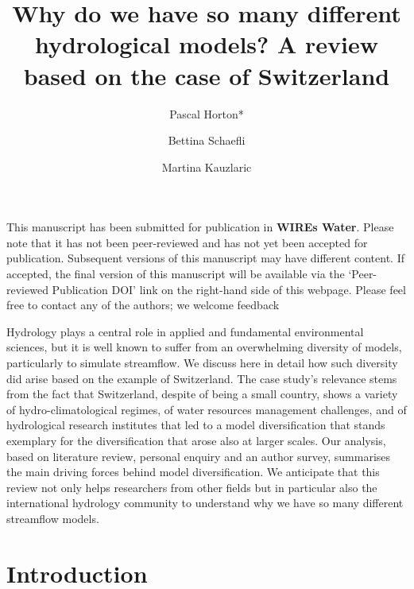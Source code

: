 \documentclass[10pt,a4paper]{article}
\def\preprint{}
\renewenvironment{abstract}
 {{\bfseries\noindent{\abstractname}\par\nobreak}\footnotesize}
 {\bigskip}
\begin{document}
\title{Why do we have so many different hydrological models? A review based on the case of Switzerland}


\author[1]{Pascal Horton*}
\author[1]{Bettina Schaefli}
\author[1]{Martina Kauzlaric}


\date{}


\ifdefined\preprint
\setcounter{page}{0}
\hrulefill

This manuscript has been submitted for publication in \textbf{WIREs Water}. Please note that it has not been peer-reviewed and has not yet been accepted for publication. Subsequent versions of this manuscript may have different content. If accepted, the final version of this manuscript will be available via the ‘Peer-reviewed Publication DOI' link on the right-hand side of this webpage. Please feel free to contact any of the authors; we welcome feedback

\hrulefill
\newpage
\fi

\begingroup
\maketitle
\endgroup




\begin{abstract}
Hydrology plays a central role in applied and fundamental environmental sciences, but it is well known to suffer from an overwhelming diversity of models, particularly to simulate streamflow. We discuss here in detail how such diversity did arise based on the example of Switzerland. The case study's relevance stems from the fact that Switzerland, despite of being a small country, shows a variety of hydro-climatological regimes, of water resources management challenges, and of hydrological research institutes that led to a model diversification that stands exemplary for the diversification that arose also at larger scales. Our analysis, based on literature review, personal enquiry and an author survey, summarises the main driving forces behind model diversification. We anticipate that this review not only helps researchers from other fields but in particular also the international hydrology community to understand why we have so many different streamflow models.
\end{abstract}


\section{Introduction}
\label{sec:intro}
\end{document}
